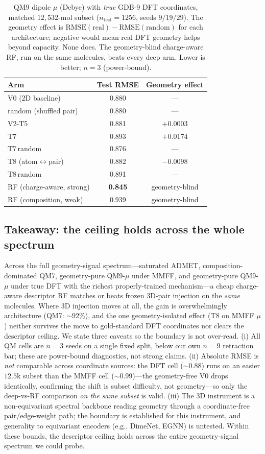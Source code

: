 \documentclass[sigconf,nonacm,anonymous,review]{acmart}
\begin{document}
\begin{table}[t]
\centering
\caption{QM9 dipole $\mu$ (Debye) with \emph{true} GDB-9 DFT coordinates, matched $12{,}532$-mol subset ($n_{\text{test}}{=}1256$, seeds $9/19/29$). The geometry effect is $\mathrm{RMSE}(\text{real}){-}\mathrm{RMSE}(\text{random})$ for each architecture; negative would mean real DFT geometry helps beyond capacity. None does. The geometry-blind charge-aware RF, run on the same molecules, beats every deep arm. Lower is better; $n{=}3$ (power-bound).}
\label{tab:dft}
\begin{tabular}{@{}lcc@{}}
\toprule
Arm & Test RMSE & Geometry effect \\
\midrule
V0 (2D baseline)        & 0.880 & --- \\
random (shuffled pair)  & 0.880 & --- \\
V2-T5                   & 0.881 & $+0.0003$ \\
T7                      & 0.893 & $+0.0174$ \\
T7\,random              & 0.876 & --- \\
T8 (atom$\leftrightarrow$pair) & 0.882 & $-0.0098$ \\
T8\,random              & 0.891 & --- \\
\midrule
RF (charge-aware, strong) & \textbf{0.845} & geometry-blind \\
RF (composition, weak)    & 0.939 & geometry-blind \\
\bottomrule
\end{tabular}
\end{table}

\subsection{Takeaway: the ceiling holds across the whole spectrum}
Across the full geometry-signal spectrum---saturated ADMET, composition-dominated QM7, geometry-pure QM9-$\mu$ under MMFF, and geometry-pure QM9-$\mu$ under true DFT with the richest properly-trained mechanism---a cheap charge-aware descriptor RF matches or beats frozen 3D-pair injection on the \emph{same} molecules. Where 3D injection moves at all, the gain is overwhelmingly architecture (QM7: $\sim 92\%$), and the one geometry-isolated effect (T8 on MMFF $\mu$) neither survives the move to gold-standard DFT coordinates nor clears the descriptor ceiling. We state three caveats so the boundary is not over-read. (i) All QM cells are $n{=}3$ seeds on a single fixed split, below our own $n{=}9$ retraction bar; these are power-bound diagnostics, not strong claims. (ii) Absolute RMSE is \emph{not} comparable across coordinate sources: the DFT cell ($\sim 0.88$) runs on an easier $12.5$k subset than the MMFF cell ($\sim 0.99$)---the geometry-free V0 drops identically, confirming the shift is subset difficulty, not geometry---so only the deep-vs-RF comparison \emph{on the same subset} is valid. (iii) The 3D instrument is a non-equivariant spectral backbone reading geometry through a coordinate-free pair/edge-weight path; the boundary is established for this instrument, and generality to equivariant encoders (e.g., DimeNet, EGNN) is untested. Within these bounds, the descriptor ceiling holds across the entire geometry-signal spectrum we could probe.
\end{document}
